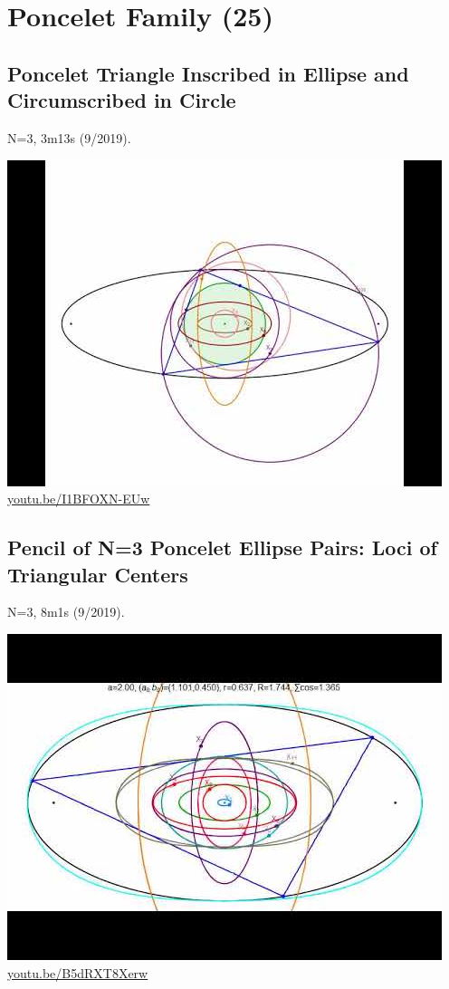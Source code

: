 \documentclass[12pt]{amsart}
\begin{document}
\section{Poncelet Family (25)}

\subsection{Poncelet Triangle Inscribed in Ellipse and Circumscribed in Circle}
\label{vid:I1BFOXN-EUw}
\noindent N=3, 3m13s (9/2019). 
\begin{center}\includegraphics[width=.5\textwidth]{pics/I1BFOXN-EUw.jpg} \\ 
\href{https://youtu.be/I1BFOXN-EUw}{\url{youtu.be/I1BFOXN-EUw}}\end{center}
% 
\subsection{Pencil of N=3 Poncelet Ellipse Pairs: Loci of Triangular Centers}
\label{vid:B5dRXT8Xerw}
\noindent N=3, 8m1s (9/2019). 
\begin{center}\includegraphics[width=.5\textwidth]{pics/B5dRXT8Xerw.jpg} \\ 
\href{https://youtu.be/B5dRXT8Xerw}{\url{youtu.be/B5dRXT8Xerw}}\end{center}
% 
\end{document}
